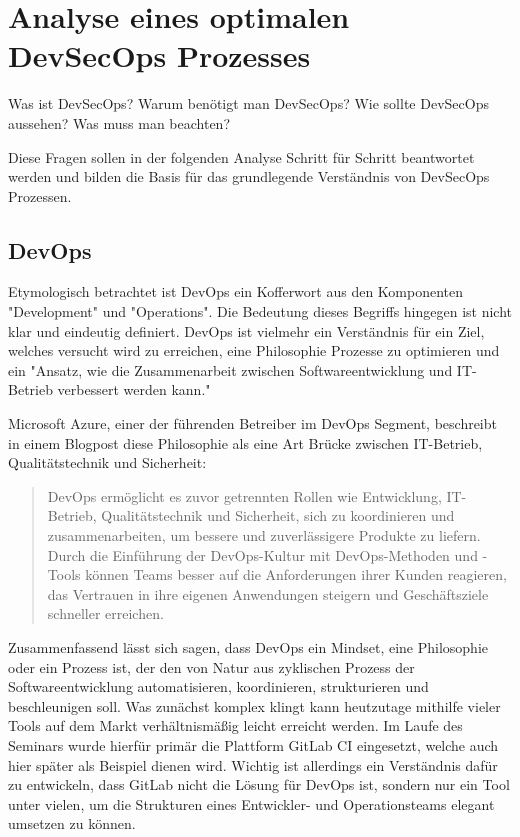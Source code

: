 \section{Analyse eines optimalen DevSecOps Prozesses}\label{sec:analysisDevSecOps}
Was ist DevSecOps?
Warum benötigt man DevSecOps?
Wie sollte DevSecOps aussehen?
Was muss man beachten?

Diese Fragen sollen in der folgenden Analyse Schritt für Schritt beantwortet werden und bilden die Basis für das grundlegende Verständnis von DevSecOps Prozessen.

\subsection{DevOps}
Etymologisch betrachtet ist DevOps ein Kofferwort aus den Komponenten "Development" und "Operations".
Die Bedeutung dieses Begriffs hingegen ist nicht klar und eindeutig definiert.
DevOps ist vielmehr ein Verständnis für ein Ziel, welches versucht wird zu erreichen, eine Philosophie Prozesse zu optimieren und ein "Ansatz, wie die Zusammenarbeit zwischen Softwareentwicklung und IT-Betrieb verbessert werden kann."\cite{DevOps2021}

Microsoft Azure, einer der führenden Betreiber im DevOps Segment, beschreibt in einem Blogpost diese Philosophie als eine Art Brücke zwischen IT-Betrieb, Qualitätstechnik und Sicherheit\cite{WasIstDevOps}:
\begin{quote}
    DevOps ermöglicht es zuvor getrennten Rollen wie Entwicklung, IT-Betrieb, Qualitätstechnik und Sicherheit, sich zu koordinieren und zusammenarbeiten, um bessere und zuverlässigere Produkte zu liefern.
    Durch die Einführung der DevOps-Kultur mit DevOps-Methoden und -Tools können Teams besser auf die Anforderungen ihrer Kunden reagieren, das Vertrauen in ihre eigenen Anwendungen steigern und Geschäftsziele schneller erreichen.
\end{quote}

Zusammenfassend lässt sich sagen, dass DevOps ein Mindset, eine Philosophie oder ein Prozess ist, der den von Natur aus zyklischen Prozess der Softwareentwicklung automatisieren, koordinieren, strukturieren und beschleunigen soll.
Was zunächst komplex klingt kann heutzutage mithilfe vieler Tools auf dem Markt verhältnismäßig leicht erreicht werden.
Im Laufe des Seminars wurde hierfür primär die Plattform GitLab CI eingesetzt, welche auch hier später als Beispiel dienen wird.
Wichtig ist allerdings ein Verständnis dafür zu entwickeln, dass GitLab nicht die Lösung für DevOps ist, sondern nur ein Tool unter vielen, um die Strukturen eines Entwickler- und Operationsteams elegant umsetzen zu können.

